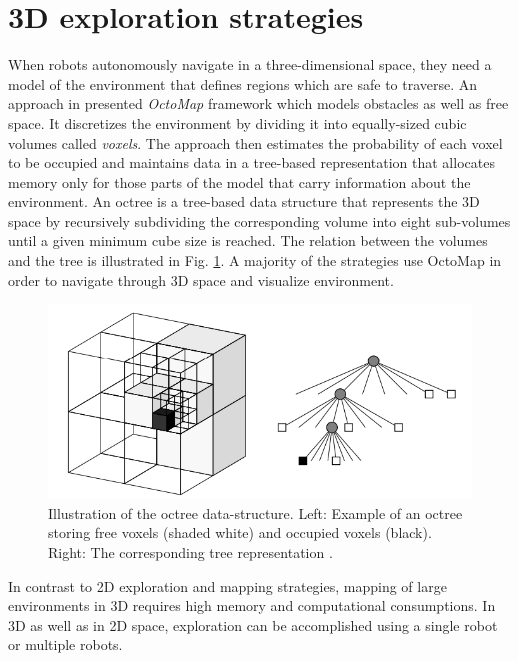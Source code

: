\section{3D exploration strategies}

When robots autonomously navigate in a three-dimensional space, they need a model of the environment that defines regions which are safe to traverse. An approach in \cite{Wurm2012} presented \textit{OctoMap} framework which models obstacles as well as free space. It discretizes the environment by dividing it into equally-sized cubic volumes called \textit{voxels}. The approach then estimates the probability of each voxel to be occupied and maintains data in a tree-based representation that allocates memory only for those parts of the model that carry information about the environment. 
An octree is a tree-based data structure that represents the 3D space by recursively subdividing the corresponding volume into eight sub-volumes until a given minimum cube size is reached. The relation between the volumes and the tree is illustrated in Fig. \ref{fig:octomap}. A majority of the strategies use OctoMap in order to navigate through 3D space and visualize environment.

\begin{figure}[t!]
	\centering
	\includegraphics[width=1.0\columnwidth]{./pictures/octomap.png}	
	\caption{Illustration of the octree data-structure. Left: Example of an octree storing free voxels (shaded white) and occupied voxels (black). Right: The corresponding tree representation \cite{Wurm2012}.}
	\label{fig:octomap}
\end{figure}


In contrast to 2D exploration and mapping strategies, mapping of large environments in 3D requires high memory and computational consumptions. In 3D as well as in 2D space, exploration can be accomplished using a single robot or multiple robots.

